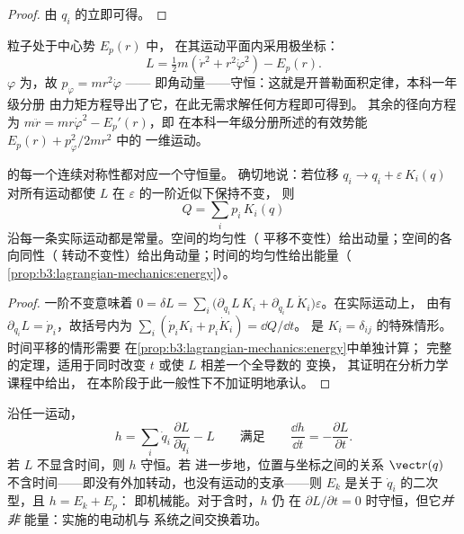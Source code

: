 \begin{proof}
由 $q_i$ 的立即可得。
\end{proof}

\begin{example}\label{ex:b3:lagrangian-mechanics:central}
粒子处于中心势 $E_p(r)$ 中，
在其运动平面内采用极坐标：
\[
L = \tfrac12 m(\dot r^2 + r^2\dot\varphi^2) - E_p(r) .
\]
$\varphi$ 为，故 $p_\varphi = mr^2\dot\varphi$ ——
即角动量——守恒：这就是开普勒面积定律，本科一年级分册
由力矩方程导出了它，在此无需求解任何方程即可得到。
其余的径向方程为
$m\ddot r = mr\dot\varphi^2 - E_p'(r)$，即
在本科一年级分册所述的有效势能 $E_p(r) + p_\varphi^2/2mr^2$ 中的
一维运动。
\end{example}

\begin{theorem}[诺特定理]\label{thm:b3:lagrangian-mechanics:noether}
的每一个连续对称性都对应一个守恒量。
确切地说：若位移 $q_i \to q_i + \varepsilon\,K_i(q)$
对所有运动都使 $L$ 在 $\varepsilon$ 的一阶近似下保持不变，
则
\[
Q = \sum_i p_i\,K_i(q)
\]
沿每一条实际运动都是常量。空间的均匀性（
平移不变性）给出动量；空间的各向同性（
转动不变性）给出角动量；时间的均匀性给出能量（
\cref{prop:b3:lagrangian-mechanics:energy}）。
\end{theorem}

\begin{proof}
一阶不变意味着
$0 = \delta L = \sum_i\big(\partial_{q_i}L\,K_i +
\partial_{\dot q_i}L\,\dot K_i\big)\varepsilon$。在实际运动上，
由有 $\partial_{q_i}L = \dot p_i$，故括号内为
$\sum_i(\dot p_iK_i + p_i\dot K_i) = \dd Q/\dd t$。
是 $K_i = \delta_{ij}$ 的特殊情形。时间平移的情形需要
在\cref{prop:b3:lagrangian-mechanics:energy}中单独计算；
完整的定理，适用于同时改变 $t$ 或使 $L$ 相差一个全导数的
变换，
其证明在分析力学课程中给出，
在本阶段于此一般性下不加证明地承认。
\end{proof}

\begin{proposition}[能量函数]\label{prop:b3:lagrangian-mechanics:energy}
沿任一运动，\emph{}
\[
h = \sum_i \dot q_i\,\frac{\partial L}{\partial\dot q_i} - L
\qquad\text{满足}\qquad
\frac{\dd h}{\dd t} = -\frac{\partial L}{\partial t} .
\]
若 $L$ 不显含时间，则 $h$ 守恒。若
进一步地，位置与坐标之间的关系 $\vect r(q)$
不含时间——即没有外加转动，也没有运动的支承——则
$E_k$ 是关于 $\dot q_i$ 的二次型，且 $h = E_k + E_p$：
即机械能。对于含时，$h$ 仍
在 $\partial L/\partial t = 0$ 时守恒，但它\emph{并非}
能量：实施的电动机与
系统之间交换着功。
\end{proposition}

